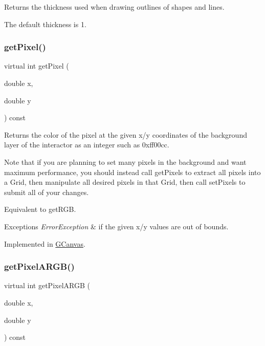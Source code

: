 Returns the thickness used when drawing outlines of shapes and lines. 

The default thickness is 1. \mbox{\label{classGDrawingSurface_a40f3e3f64a8263e13b7162e15b2979ee}} 
\subsubsection{\texorpdfstring{get\+Pixel()}{getPixel()}}
{\footnotesize\ttfamily virtual int get\+Pixel (\begin{DoxyParamCaption}\item[{double}]{x,  }\item[{double}]{y }\end{DoxyParamCaption}) const\hspace{0.3cm}{\ttfamily [pure virtual]}}



Returns the color of the pixel at the given x/y coordinates of the background layer of the interactor as an integer such as 0xff00cc. 

Note that if you are planning to set many pixels in the background and want maximum performance, you should instead call get\+Pixels to extract all pixels into a Grid, then manipulate all desired pixels in that Grid, then call set\+Pixels to submit all of your changes.

Equivalent to get\+R\+GB.


\begin{DoxyExceptions}{Exceptions}
{\em Error\+Exception} & if the given x/y values are out of bounds. \\
\hline
\end{DoxyExceptions}


Implemented in \mbox{\hyperlink{classGCanvas_a342aaa6de62a4a324a2e4f3921db1d3e}{G\+Canvas}}.

\mbox{\label{classGDrawingSurface_aee10de1ca7da1fc3f3fc0e48286f88f8}} 
\subsubsection{\texorpdfstring{get\+Pixel\+A\+R\+G\+B()}{getPixelARGB()}}
{\footnotesize\ttfamily virtual int get\+Pixel\+A\+R\+GB (\begin{DoxyParamCaption}\item[{double}]{x,  }\item[{double}]{y }\end{DoxyParamCaption}) const\hspace{0.3cm}{\ttfamily [pure virtual]}}



